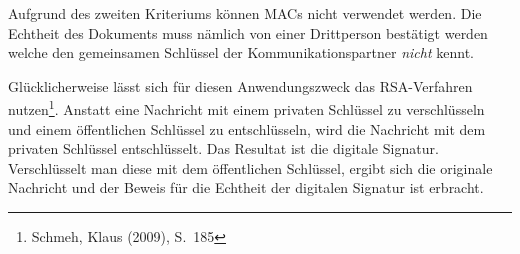 Aufgrund des zweiten Kriteriums können \ac{MAC}s nicht verwendet
werden.  Die Echtheit des Dokuments muss nämlich von einer Drittperson
bestätigt werden welche den gemeinsamen Schlüssel der
Kommunikationspartner \emph{nicht} kennt.

Glücklicherweise lässt sich für diesen Anwendungszweck das
\ac{RSA}-Verfahren nutzen\footnote{Schmeh, Klaus (2009), S.~185}.
Anstatt eine Nachricht mit einem privaten Schlüssel zu verschlüsseln
und einem öffentlichen Schlüssel zu entschlüsseln, wird die Nachricht
mit dem privaten Schlüssel entschlüsselt.  Das Resultat ist die
digitale Signatur.  Verschlüsselt man diese mit dem öffentlichen
Schlüssel, ergibt sich die originale Nachricht und der Beweis für die
Echtheit der digitalen Signatur ist erbracht.
